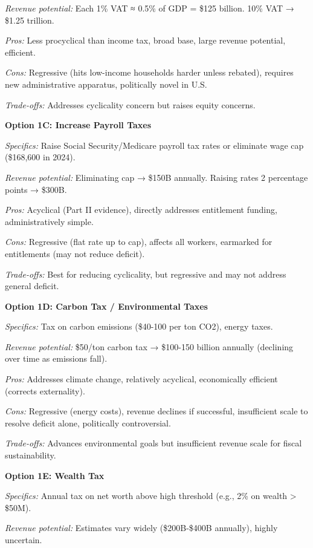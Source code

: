 \documentclass[12pt,letterpaper]{article}
\begin{document}
\textit{Revenue potential:} Each 1\% VAT ≈ 0.5\% of GDP = \$125 billion. 10\% VAT → \$1.25 trillion.

\textit{Pros:} Less procyclical than income tax, broad base, large revenue potential, efficient.

\textit{Cons:} Regressive (hits low-income households harder unless rebated), requires new administrative apparatus, politically novel in U.S.

\textit{Trade-offs:} Addresses cyclicality concern but raises equity concerns.

\textbf{Option 1C: Increase Payroll Taxes}

\textit{Specifics:} Raise Social Security/Medicare payroll tax rates or eliminate wage cap (\$168,600 in 2024).

\textit{Revenue potential:} Eliminating cap → \$150B annually. Raising rates 2 percentage points → \$300B.

\textit{Pros:} Acyclical (Part II evidence), directly addresses entitlement funding, administratively simple.

\textit{Cons:} Regressive (flat rate up to cap), affects all workers, earmarked for entitlements (may not reduce deficit).

\textit{Trade-offs:} Best for reducing cyclicality, but regressive and may not address general deficit.

\textbf{Option 1D: Carbon Tax / Environmental Taxes}

\textit{Specifics:} Tax on carbon emissions (\$40-100 per ton CO2), energy taxes.

\textit{Revenue potential:} \$50/ton carbon tax → \$100-150 billion annually (declining over time as emissions fall).

\textit{Pros:} Addresses climate change, relatively acyclical, economically efficient (corrects externality).

\textit{Cons:} Regressive (energy costs), revenue declines if successful, insufficient scale to resolve deficit alone, politically controversial.

\textit{Trade-offs:} Advances environmental goals but insufficient revenue scale for fiscal sustainability.

\textbf{Option 1E: Wealth Tax}

\textit{Specifics:} Annual tax on net worth above high threshold (e.g., 2\% on wealth > \$50M).

\textit{Revenue potential:} Estimates vary widely (\$200B-\$400B annually), highly uncertain.
\end{document}
